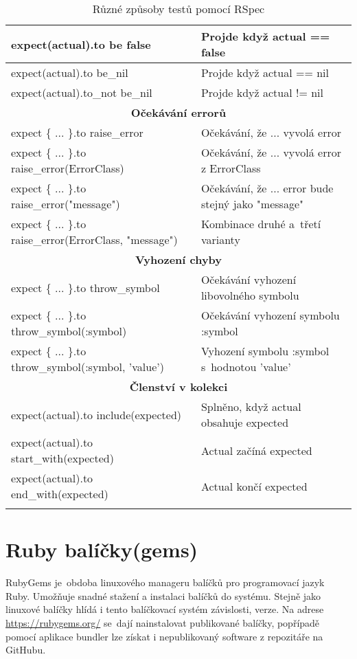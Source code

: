 \begin{center}
\begin{longtable}{| m{} | m{} |}
 \hline
 expect(actual).to be false   & Projde když actual == false \\
 \hline
 expect(actual).to be\_nil     & Projde když actual == nil \\
 \hline
 expect(actual).to\_not be\_nil & Projde když actual != nil \\
 \hline
 \multicolumn{2}{||c||}{\textbf{Očekávání errorů}}\\
 \hline
 expect \{ ... \}.to raise\_error & Očekávání, že ... vyvolá error \\
 \hline
 expect \{ ... \}.to raise\_error(ErrorClass) & Očekávání, že ... vyvolá error z ErrorClass\\
 \hline
 expect \{ ... \}.to raise\_error("message") & Očekávání, že ... error bude stejný jako "message" \\
 \hline
 expect \{ ... \}.to raise\_error(ErrorClass, "message")  & Kombinace druhé a~třetí varianty \\
 \hline
 \multicolumn{2}{||c||}{\textbf{Vyhození chyby}}\\
 \hline
 expect \{ ... \}.to throw\_symbol & Očekávání vyhození libovolného symbolu\\ 
 \hline
 expect \{ ... \}.to throw\_symbol(:symbol) & Očekávání vyhození symbolu :symbol\\ 
 \hline
 expect \{ ... \}.to throw\_symbol(:symbol, 'value') & Vyhození symbolu :symbol s~hodnotou 'value'\\ 
 \hline
 \multicolumn{2}{||c||}{\textbf{Členství v kolekci}}\\
 \hline
 expect(actual).to include(expected) & Splněno, když actual obsahuje expected \\
 \hline
 expect(actual).to start\_with(expected) & Actual začíná expected \\
 \hline
 expect(actual).to end\_with(expected) & Actual končí expected \\
 \hline
 \caption[RSpec metody testování]{Různé způsoby testů pomocí RSpec}\label{tab:rspec}
\end{longtable}
\end{center}

\section{Ruby balíčky(gems)}
\par RubyGems\cite{elmendorfdirk2006} je~obdoba linuxového manageru balíčků pro programovací jazyk Ruby. Umožňuje snadné stažení a instalaci balíčků do systému. Stejně jako linuxové balíčky hlídá i tento balíčkovací systém závislosti, verze. Na adrese \url{https://rubygems.org/} se~dají nainstalovat publikované balíčky, popřípadě pomocí aplikace bundler lze získat i nepublikovaný software z repozitáře na GitHubu. 